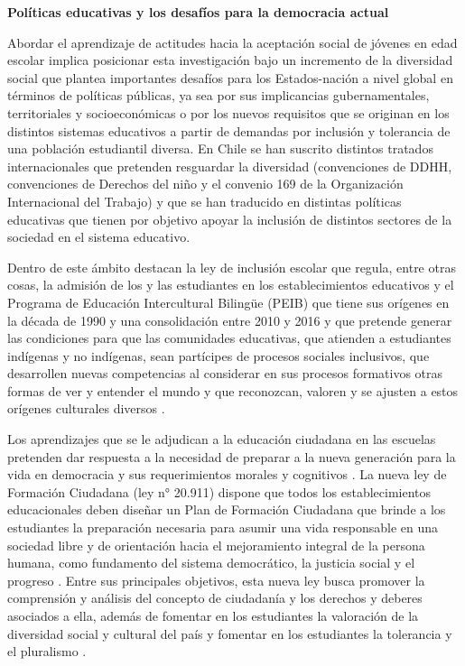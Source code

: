 \documentclass[12pt,twoside]{templates/facsothesis}
\begin{document}
\textbf{Políticas educativas y los desafíos para la democracia actual}

Abordar el aprendizaje de actitudes hacia la aceptación social de jóvenes en edad escolar implica posicionar esta investigación bajo un incremento de la diversidad social que plantea importantes desafíos para los Estados-nación a nivel global en términos de políticas públicas, ya sea por sus implicancias gubernamentales, territoriales y socioeconómicas o por los nuevos requisitos que se originan en los distintos sistemas educativos a partir de demandas por inclusión y tolerancia de una población estudiantil diversa. En Chile se han suscrito distintos tratados internacionales que pretenden resguardar la diversidad (convenciones de DDHH, convenciones de Derechos del niño y el convenio 169 de la Organización Internacional del Trabajo) y que se han traducido en distintas políticas educativas que tienen por objetivo apoyar la inclusión de distintos sectores de la sociedad en el sistema educativo.

Dentro de este ámbito destacan la ley de inclusión escolar que regula, entre otras cosas, la admisión de los y las estudiantes en los establecimientos educativos \citep{bibliotecadelcongresonacional_ley_2015} y el Programa de Educación Intercultural Bilingüe (PEIB) que tiene sus orígenes en la década de 1990 y una consolidación entre 2010 y 2016 y que pretende generar las condiciones para que las comunidades educativas, que atienden a estudiantes indígenas y no indígenas, sean partícipes de procesos sociales inclusivos, que desarrollen nuevas competencias al considerar en sus procesos formativos otras formas de ver y entender el mundo y que reconozcan, valoren y se ajusten a estos orígenes culturales diversos \citep{ministeriodeeducacion_Programa_2017}.

Los aprendizajes que se le adjudican a la educación ciudadana en las escuelas pretenden dar respuesta a la necesidad de preparar a la nueva generación para la vida en democracia y sus requerimientos morales y cognitivos \citep{cox_objetivos_2015}. La nueva ley de Formación Ciudadana (ley n° 20.911) dispone que todos los establecimientos educacionales deben diseñar un Plan de Formación Ciudadana que brinde a los estudiantes la preparación necesaria para asumir una vida responsable en una sociedad libre y de orientación hacia el mejoramiento integral de la persona humana, como fundamento del sistema democrático, la justicia social y el progreso \citep{bibliotecadelcongresonacional_plan_2016}. Entre sus principales objetivos, esta nueva ley busca promover la comprensión y análisis del concepto de ciudadanía y los derechos y deberes asociados a ella, además de fomentar en los estudiantes la valoración de la diversidad social y cultural del país y fomentar en los estudiantes la tolerancia y el pluralismo \citep{bibliotecadelcongresonacional_plan_2016}.
\end{document}
